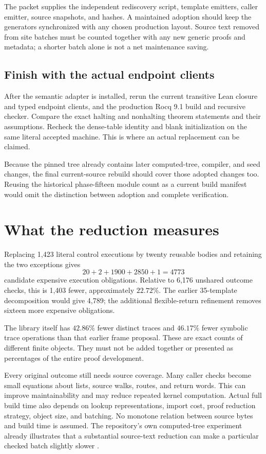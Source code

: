 \documentclass[11pt]{article}
\theoremstyle{definition}\newtheorem{definition}[theorem]{Definition}
\theoremstyle{remark}\newtheorem{remark}[theorem]{Remark}
\begin{document}
The packet supplies the independent rediscovery script, template emitters, caller emitter, source snapshots, and hashes. A maintained adoption should keep the generators synchronized with any chosen production layout. Source text removed from site batches must be counted together with any new generic proofs and metadata; a shorter batch alone is not a net maintenance saving.

\subsection{Finish with the actual endpoint clients}

After the semantic adapter is installed, rerun the current transitive Lean closure and typed endpoint clients, and the production Rocq 9.1 build and recursive checker. Compare the exact halting and nonhalting theorem statements and their assumptions. Recheck the dense-table identity and blank initialization on the same literal accepted machine. This is where an actual replacement can be claimed.

Because the pinned tree already contains later computed-tree, compiler, and seed changes, the final current-source rebuild should cover those adopted changes too. Reusing the historical phase-fifteen module count as a current build manifest would omit the distinction between adoption and complete verification.

\section{What the reduction measures}

Replacing 1,423 literal control executions by twenty reusable bodies and retaining the two exceptions gives
\[
 20+2+1900+2850+1=4773
\]
candidate expensive execution obligations. Relative to 6,176 unshared outcome checks, this is 1,403 fewer, approximately $22.72\%$. The earlier 35-template decomposition would give 4,789; the additional flexible-return refinement removes sixteen more expensive obligations.

The library itself has $42.86\%$ fewer distinct traces and $46.17\%$ fewer symbolic trace operations than that earlier frame proposal. These are exact counts of different finite objects. They must not be added together or presented as percentages of the entire proof development.

Every original outcome still needs source coverage. Many caller checks become small equations about lists, source walks, routes, and return words. This can improve maintainability and may reduce repeated kernel computation. Actual full build time also depends on lookup representations, import cost, proof reduction strategy, object size, and batching. No monotone relation between source bytes and build time is assumed. The repository's own computed-tree experiment already illustrates that a substantial source-text reduction can make a particular checked batch slightly slower \cite{computed}.
\end{document}
